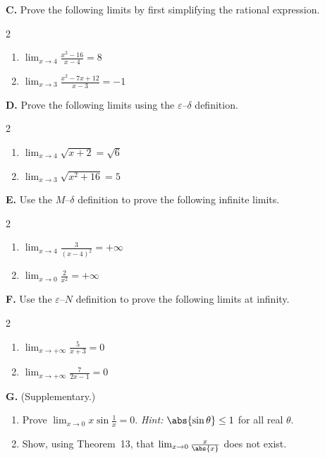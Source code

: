 \medskip
\noindent\textbf{C.} Prove the following limits by first simplifying the rational expression.

\begin{multicols}{2}
\begin{enumerate}[label=\arabic*., start=6, nosep, topsep=0pt, itemsep=2pt]
    \item \(\lim_{x \to 4} \frac{x^{2} - 16}{x - 4} = 8\)
    \item \(\lim_{x \to 3} \frac{x^{2} - 7x + 12}{x - 3} = -1\)
\end{enumerate}
\end{multicols}

\medskip
\noindent\textbf{D.} Prove the following limits using the \(\varepsilon\)--\(\delta\) definition.

\begin{multicols}{2}
\begin{enumerate}[label=\arabic*., start=8, nosep, topsep=0pt, itemsep=2pt]
    \item \(\lim_{x \to 4} \sqrt{x + 2} = \sqrt{6}\)
    \item \(\lim_{x \to 3} \sqrt{x^{2} + 16} = 5\)
\end{enumerate}
\end{multicols}

\medskip
\noindent\textbf{E.} Use the \(M\)--\(\delta\) definition to prove the following infinite limits.

\begin{multicols}{2}
\begin{enumerate}[label=\arabic*., start=10, nosep, topsep=0pt, itemsep=2pt]
    \item \(\lim_{x \to 4} \frac{3}{(x - 4)^{2}} = +\infty\)
    \item \(\lim_{x \to 0} \frac{2}{x^{2}} = +\infty\)
\end{enumerate}
\end{multicols}

\medskip
\noindent\textbf{F.} Use the \(\varepsilon\)--\(N\) definition to prove the following limits at infinity.

\begin{multicols}{2}
\begin{enumerate}[label=\arabic*., start=12, nosep, topsep=0pt, itemsep=2pt]
    \item \(\lim_{x \to +\infty} \frac{5}{x + 3} = 0\)
    \item \(\lim_{x \to +\infty} \frac{7}{2x - 1} = 0\)
\end{enumerate}
\end{multicols}

\medskip
\noindent\textbf{G.} (Supplementary.)

\begin{enumerate}[label=\arabic*., start=14, nosep, topsep=0pt, itemsep=2pt]
    \item Prove \(\lim_{x \to 0} x\sin\frac{1}{x} = 0\).  \textit{Hint:} \(\abs{\sin\theta} \le 1\) for all real \(\theta\).
    \item Show, using Theorem~13, that \(\lim_{x \to 0} \frac{x}{\abs{x}}\) does not exist.
\end{enumerate}